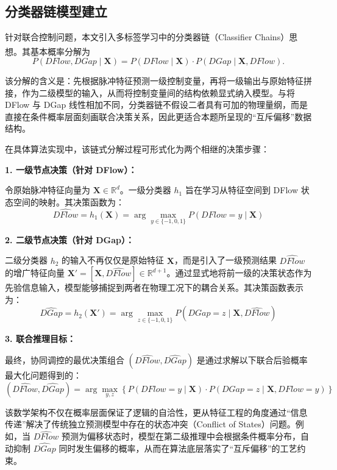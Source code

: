 \documentclass[UTF8,a4paper,12pt]{ctexart}
\newcommand{\upcite}[1]{\textsuperscript{\cite{#1}}}
\begin{document}
\subsection{分类器链模型建立}

针对联合控制问题，本文引入多标签学习中的分类器链（Classifier Chains）思想\upcite{ref11}。其基本概率分解为
\begin{equation}
P(DFlow,DGap\mid \bm{X})=P(DFlow\mid \bm{X})\cdot P(DGap\mid \bm{X},DFlow).
\label{eq:chain}
\end{equation}

该分解的含义是：先根据脉冲特征预测一级控制变量，再将一级输出与原始特征拼接，作为二级模型的输入，从而将控制变量间的结构依赖显式纳入模型。与将 DFlow 与 DGap 线性相加不同，分类器链不假设二者具有可加的物理量纲，而是直接在条件概率层面刻画联合决策关系，因此更适合本题所呈现的“互斥偏移”数据结构。

在具体算法实现中，该链式分解过程可形式化为两个相继的决策步骤：

\textbf{1. 一级节点决策（针对 DFlow）：}

令原始脉冲特征向量为 $\bm{X} \in \mathbb{R}^d$。一级分类器 $h_1$ 旨在学习从特征空间到 DFlow 状态空间的映射。其决策函数为：
\begin{equation}
    \widehat{DFlow} = h_1(\bm{X}) = \arg\max_{y \in \{-1,0,1\}} P(DFlow = y \mid \bm{X})
\end{equation}

\textbf{2. 二级节点决策（针对 DGap）：}

二级分类器 $h_2$ 的输入不再仅仅是原始特征 $\bm{X}$，而是引入了一级预测结果 $\widehat{DFlow}$ 的增广特征向量 $\bm{X}' = [\bm{X}, \widehat{DFlow}] \in \mathbb{R}^{d+1}$。通过显式地将前一级的决策状态作为先验信息输入，模型能够捕捉到两者在物理工况下的耦合关系。其决策函数表示为：
\begin{equation}
    \widehat{DGap} = h_2(\bm{X}') = \arg\max_{z \in \{-1,0,1\}} P(DGap = z \mid \bm{X}, \widehat{DFlow})
\end{equation}

\textbf{3. 联合推理目标：}

最终，协同调控的最优决策组合 $(\widehat{DFlow}, \widehat{DGap})$ 是通过求解以下联合后验概率最大化问题得到的：
\begin{equation}
    (\widehat{DFlow}, \widehat{DGap}) = \arg\max_{y, z} \left\{ P(DFlow=y \mid \bm{X}) \cdot P(DGap=z \mid \bm{X}, DFlow=y) \right\}
\end{equation}

该数学架构不仅在概率层面保证了逻辑的自洽性，更从特征工程的角度通过“信息传递”解决了传统独立预测模型中存在的状态冲突（Conflict of States）问题。例如，当 $\widehat{DFlow}$ 预测为偏移状态时，模型在第二级推理中会根据条件概率分布，自动抑制 $\widehat{DGap}$ 同时发生偏移的概率，从而在算法底层落实了“互斥偏移”的工艺约束。
\end{document}
